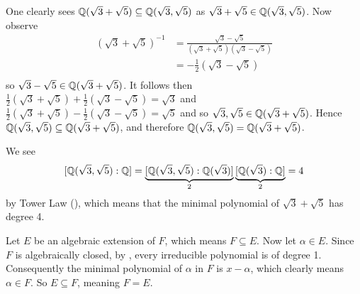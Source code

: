 \begin{questions}
    \item \begin{partquestions}{\roman*}
        \item One clearly sees $\mathbb{Q}(\sqrt3 + \sqrt5) \subseteq \mathbb{Q}(\sqrt3, \sqrt5)$ as $\sqrt3 + \sqrt5 \in \mathbb{Q}(\sqrt3, \sqrt5)$. Now observe
        \begin{align*}
            \left(\sqrt3+\sqrt5\right)^{-1} &= \frac{\sqrt3-\sqrt5}{\left(\sqrt3+\sqrt5\right)\left(\sqrt3-\sqrt5\right)}\\
            &= -\frac12\left(\sqrt3-\sqrt5\right)\\
        \end{align*}
        so $\sqrt3-\sqrt5 \in \mathbb{Q}(\sqrt3 + \sqrt5)$. It follows then $\frac12\left(\sqrt3 + \sqrt5\right) + \frac12\left(\sqrt3 - \sqrt5\right) = \sqrt3$ and $\frac12\left(\sqrt3 + \sqrt5\right) - \frac12\left(\sqrt3 - \sqrt5\right) = \sqrt5$ and so $\sqrt3,\sqrt5\in\mathbb{Q}(\sqrt3+\sqrt5)$. Hence $\mathbb{Q}(\sqrt3,\sqrt5)\subseteq\mathbb{Q}(\sqrt3+\sqrt5)$, and therefore $\mathbb{Q}(\sqrt3, \sqrt5) = \mathbb{Q}(\sqrt3 + \sqrt5)$.

        \item We see
        \[
            [\mathbb{Q}(\sqrt3, \sqrt5): \mathbb{Q}] = \underbrace{[\mathbb{Q}(\sqrt3, \sqrt5): \mathbb{Q}(\sqrt3)]}_2\underbrace{[\mathbb{Q}(\sqrt3):\mathbb{Q}]}_2 = 4
        \]
        by Tower Law (), which means that the minimal polynomial of $\sqrt3+\sqrt5$ has degree 4.
    \end{partquestions}

    \item Let $E$ be an algebraic extension of $F$, which means $F \subseteq E$. Now let $\alpha \in E$. Since $F$ is algebraically closed, by , every irreducible polynomial is of degree 1. Consequently the minimal polynomial of $\alpha$ in $F$ is $x - \alpha$, which clearly means $\alpha \in F$. So $E \subseteq F$, meaning $F = E$.
\end{questions}
